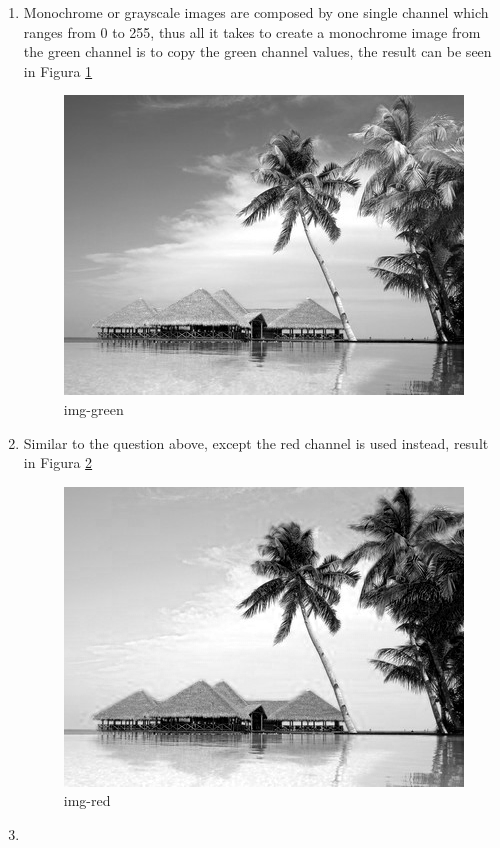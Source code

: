 \begin{enumerate}
\begin{enumerate}
\item Monochrome or grayscale images are composed by one single channel which ranges from 0 to 255, thus all it takes to create a monochrome image from the green channel is to copy the green channel values, the result can be seen in Figura \ref{fig:img-green}

\begin{figure}[ht]
\centering
\includegraphics{output/img-green}
\caption{img-green}
\label{fig:img-green}
\end{figure}

\item Similar to the question above, except the red channel is used instead, result in Figura \ref{fig:img-red}

\begin{figure}[ht]
\centering
\includegraphics{output/img-red}
\caption{img-red}
\label{fig:img-red}
\end{figure}

\item 


\end{enumerate}
\end{enumerate}
